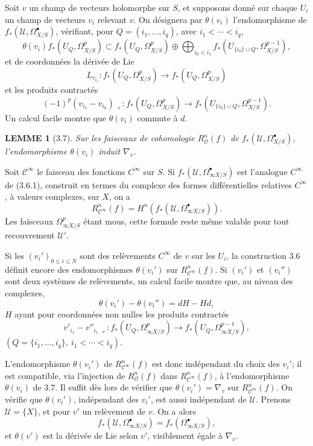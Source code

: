 \documentclass[10pt]{article}
\newcommand{\cO}{\mathcal O}
\newcommand{\cU}{\mathcal U}
\newcommand{\cC}{\mathcal C}
\theoremstyle{deligne}
\newtheorem*{lemme}{LEMME}
\begin{document}
Soit $v$ un champ de vecteurs holomorphe sur $S$, et supposons donné sur chaque $U_i$ un champ de vecteurs $v_i$ relevant $v$. On désignera par $\theta(v_i)$ l'endomorphisme de $f_*(\cU,\Omega^\bullet_{X/S})$, vérifiant, pour $Q=(i_1,\ldots,i_q)$, avec $i_1<\cdots<i_q$,
\[
\theta(v_i) f_*(U_Q,\Omega^p_{X/S})
\subset
f_*(U_Q,\Omega^p_{X/S})
\oplus
\bigoplus_{i_0<i_1} f_*(U_{\{i_0\}\cup Q},\Omega^{p-1}_{X/S}),
\]
et de coordonnées la dérivée de Lie
\[
L_{v_{i_1}}:f_*(U_Q,\Omega^p_{X/S})\longrightarrow f_*(U_Q,\Omega^p_{X/S})
\]
et les produits contractés
\[
(-1)^p(v_{i_1}-v_{i_0})\lrcorner:
 f_*(U_Q,\Omega^p_{X/S})\longrightarrow f_*(U_{\{i_0\}\cup Q},\Omega^{p-1}_{X/S}).
\]
Un calcul facile montre que $\theta(v_i)$ commute à $d$.

\begin{lemme}[3.7]
Sur les faisceaux de cohomologie $R_\cO^n(f)$ de $f_*(\cU,\Omega^\bullet_{X/S})$, l'endomorphisme $\theta(v_i)$ induit $\nabla_v$.
\end{lemme}

Soit $\cC^\infty$ le faisceau des fonctions $C^\infty$ sur $S$. Si $f_*(\cU,\Omega^\bullet_{\infty X/S})$ est l'analogue $C^\infty$ de (3.6.1), construit en termes du complexe des formes différentielles relatives $C^\infty$, à valeurs complexes, sur $X$, on a
\[
R_{\cC^\infty}^n(f)=H^n(f_*(\cU,\Omega^\bullet_{\infty X/S})).
\]
Les faisceaux $\Omega^p_{\infty X/S}$ étant mous, cette formule reste même valable pour tout recouvrement $\cU'$.

Si les $(v_i')_{0\le i\le N}$ sont des relèvements $C^\infty$ de $v$ sur les $U_i$, la construction 3.6 définit encore des endomorphismes $\theta(v_i')$ sur $R_{\cC^\infty}^n(f)$. Si $(v_i')$ et $(v_i'')$ sont deux systèmes de relèvements, un calcul facile montre que, au niveau des complexes,
\begin{equation}
\theta(v_i')-\theta(v_i'')=dH-Hd,
\tag{3.7.1}
\end{equation}
$H$ ayant pour coordonnées non nulles les produits contractés
\[
v'_{i_1}-v''_{i_1}\lrcorner:
 f_*(U_Q,\Omega^p_{\infty X/S})\longrightarrow f_*(U_Q,\Omega^{p-1}_{\infty X/S}),
\]
$(Q=\{i_1,\ldots,i_q\},\ i_1<\cdots<i_q)$.

L'endomorphisme $\theta(v_i')$ de $R_{\cC^\infty}^n(f)$ est donc indépendant du choix des $v_i'$; il est compatible, via l'injection de $R_\cO^n(f)$ dans $R_{\cC^\infty}^n(f)$, à l'endomorphisme $\theta(v_i)$ de 3.7. Il suffit dès lors de vérifier que $\theta(v_i')=\nabla_v$ sur $R_{\cC^\infty}^n(f)$. On vérifie que $\theta(v_i')$, indépendant des $v_i'$, est aussi indépendant de $\cU$. Prenons $\cU=\{X\}$, et pour $v'$ un relèvement de $v$. On a alors
\[
f_*(\cU,\Omega^\bullet_{\infty X/S})=f_*(\Omega^\bullet_{\infty X/S}),
\]
et $\theta(v')$ est la dérivée de Lie selon $v'$, visiblement égale à $\nabla_v$.
\end{document}
